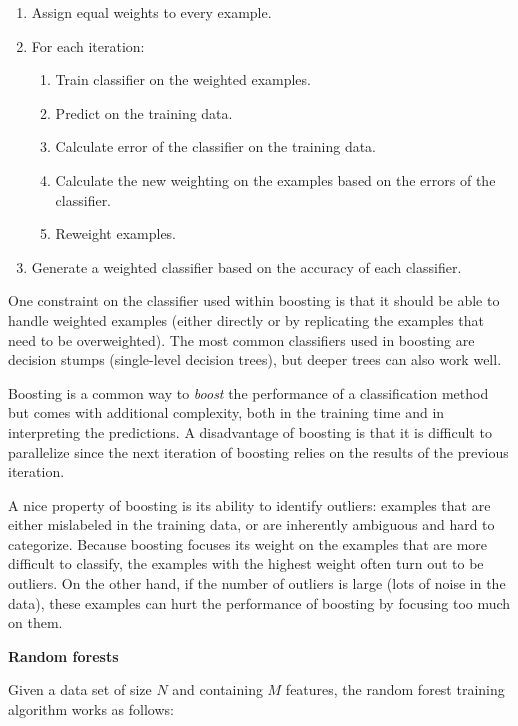 \documentclass[]{krantz}
\begin{document}
\begin{enumerate}
\def\labelenumi{\arabic{enumi}.}
\item
  Assign equal weights to every example.
\item
  For each iteration:

  \begin{enumerate}
  \def\labelenumii{\arabic{enumii}.}
  \item
    Train classifier on the weighted examples.
  \item
    Predict on the training data.
  \item
    Calculate error of the classifier on the training data.
  \item
    Calculate the new weighting on the examples based on the errors of
    the classifier.
  \item
    Reweight examples.
  \end{enumerate}
\item
  Generate a weighted classifier based on the accuracy of each
  classifier.
\end{enumerate}

One constraint on the classifier used within boosting is that it should
be able to handle weighted examples (either directly or by replicating
the examples that need to be overweighted). The most common classifiers
used in boosting are decision stumps (single-level decision trees), but
deeper trees can also work well.

Boosting is a common way to \emph{boost} the performance of a
classification method but comes with additional complexity, both in the
training time and in interpreting the predictions. A disadvantage of
boosting is that it is difficult to parallelize since the next iteration
of boosting relies on the results of the previous iteration.

A nice property of boosting is its ability to identify outliers:
examples that are either mislabeled in the training data, or are
inherently ambiguous and hard to categorize. Because boosting focuses
its weight on the examples that are more difficult to classify, the
examples with the highest weight often turn out to be outliers. On the
other hand, if the number of outliers is large (lots of noise in the
data), these examples can hurt the performance of boosting by focusing
too much on them.

\textbf{Random forests}

Given a data set of size \(N\) and containing \(M\) features, the random
forest training algorithm works as follows:
\end{document}
